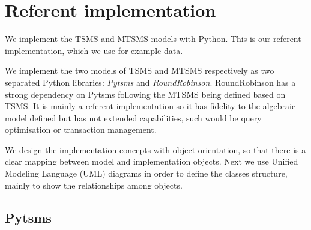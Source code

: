 







\section{Referent implementation}
\label{sec:implementation}

We implement the TSMS and MTSMS models with Python. This is our
referent implementation, which we use for example data.  

We implement the two models of TSMS and MTSMS respectively as two
separated Python libraries: \emph{Pytsms} and \emph{RoundRobinson}.
RoundRobinson has a strong dependency on Pytsms following the MTSMS
being defined based on TSMS.  It is mainly a referent implementation
so it has fidelity to the algebraic model defined but has not extended
 capabilities, such would be query optimisation or
transaction management.

We design the implementation concepts with object orientation, so that
there is a clear mapping between model and implementation
objects. Next we use Unified Modeling Language (UML) diagrams in order
to define the classes structure, mainly to show the relationships
among objects.


\subsection{Pytsms}

